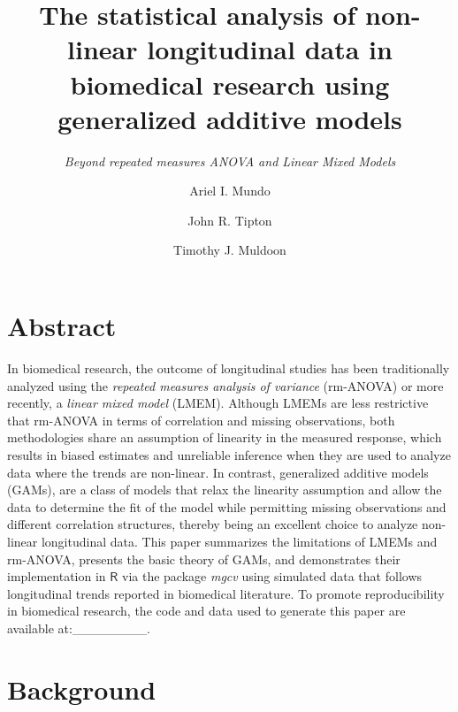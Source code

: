 \documentclass[
]{article}
\author[1]{Ariel I. Mundo}
\author[2]{John R. Tipton}
\author[1]{Timothy J. Muldoon}
\affil[1]{\footnotesize Department of Biomedical Engineering, University of Arkansas, Fayetteville, AR, USA}
\affil[2]{\footnotesize Department of Mathematical Sciences, University of Arkansas, Fayetteville, AR, USA}
\title{\textbf{The statistical analysis of non-linear longitudinal data in biomedical research using generalized additive models}}
\subtitle{\emph{Beyond repeated measures ANOVA and Linear Mixed Models}}
\author{}
\date{\vspace{-2.5em}}
\begin{document}
\maketitle

{
\setcounter{tocdepth}{2}
\tableofcontents
}
\hypertarget{abstract}{%
\section{Abstract}\label{abstract}}

In biomedical research, the outcome of longitudinal studies has been traditionally analyzed using the \emph{repeated measures analysis of variance} (rm-ANOVA) or more recently, a \emph{linear mixed model} (LMEM). Although LMEMs are less restrictive that rm-ANOVA in terms of correlation and missing observations, both methodologies share an assumption of linearity in the measured response, which results in biased estimates and unreliable inference when they are used to analyze data where the trends are non-linear. In contrast, generalized additive models (GAMs), are a class of models that relax the linearity assumption and allow the data to determine the fit of the model while permitting missing observations and different correlation structures, thereby being an excellent choice to analyze non-linear longitudinal data. This paper summarizes the limitations of LMEMs and rm-ANOVA, presents the basic theory of GAMs, and demonstrates their implementation in \(\textsf{R}\) via the package \emph{mgcv} using simulated data that follows longitudinal trends reported in biomedical literature. To promote reproducibility in biomedical research, the code and data used to generate this paper are available at:\_\_\_\_\_\_\_\_.

\hypertarget{background}{%
\section{Background}\label{background}}
\end{document}
